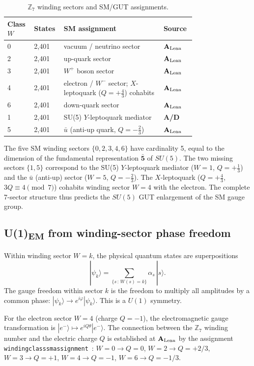 \documentclass[11pt]{article}
\theoremstyle{remark}
\newcommand{\lean}[1]{%
  \penalty-100
  \begingroup\def\_{\textunderscore\allowbreak}\texttt{#1}\endgroup}
\newcommand{\CatAL}{\ensuremath{\textbf{A}_{\rm Lean}}}
\newcommand{\CatAD}{\textbf{A/D}}
\newcommand{\ket}[1]{|{#1}\rangle}
\begin{document}
\begin{table}[h!]
\centering
\footnotesize
\caption{$\mathbb{Z}_7$ winding sectors and SM/GUT assignments.}
\label{tab:winding}
\begin{tabular}{P{0.09\linewidth}P{0.09\linewidth}P{0.48\linewidth}P{0.10\linewidth}}
\toprule
Class $W$ & States & SM assignment & Source \\
 & 2{,}401 & vacuum / neutrino sector & \CatAL{} \\
2 & 2{,}401 & up-quark sector & \CatAL{} \\
3 & 2{,}401 & $W^+$ boson sector & \CatAL{} \\
4 & 2{,}401 & electron / $W^-$ sector; $X$-leptoquark ($Q=+\tfrac{4}{3}$) cohabits & \CatAL{} \\
6 & 2{,}401 & down-quark sector & \CatAL{} \\
 & 2{,}401 & SU(5) $Y$-leptoquark mediator & \CatAD{} \\
5 & 2{,}401 & $\bar{u}$ (anti-up quark, $Q=-\tfrac{2}{3}$) & \CatAL{} \\
\bottomrule
\end{tabular}
\end{table}

The five SM winding sectors $\{0,2,3,4,6\}$ have cardinality 5,
equal to the dimension of the fundamental representation $\mathbf{\bar{5}}$
of $SU(5)$.
The two missing sectors $\{1,5\}$ correspond to the SU(5) $Y$-leptoquark
mediator ($W=1$, $Q=+\tfrac{1}{3}$) and the $\bar{u}$ (anti-up) sector
($W=5$, $Q=-\tfrac{2}{3}$).
The $X$-leptoquark ($Q=+\tfrac{4}{3}$, $3Q\equiv 4\pmod{7}$) cohabits
winding sector $W=4$ with the electron.
The complete 7-sector structure thus predicts the $SU(5)$ GUT
enlargement of the SM gauge group.

\subsection{U(1)\textsubscript{EM} from winding-sector phase freedom}
\label{ssec:u1em}

Within winding sector $W = k$, the physical quantum states are
superpositions
\[
\ket{\psi_k} = \sum_{\{s\,:\,W(s)=k\}} \alpha_s\,\ket{s}.
\]
The gauge freedom within sector $k$ is the freedom to multiply all
amplitudes by a common phase: $\ket{\psi_k} \to e^{i\varphi}\ket{\psi_k}$.
This is a $U(1)$ symmetry.

For the electron sector $W=4$ (charge $Q=-1$), the electromagnetic
gauge transformation is $\ket{e^-}\mapsto e^{iQ\theta}\ket{e^-}$.
The connection between the $\mathbb{Z}_7$ winding number and the electric
charge $Q$ is established at \CatAL{} by the assignment
\lean{winding\_class\_sm\_assignment}~\cite{ugp-p01}:
$W=0\to Q=0$, $W=2\to Q=+2/3$, $W=3\to Q=+1$,
$W=4\to Q=-1$, $W=6\to Q=-1/3$.
\end{document}
